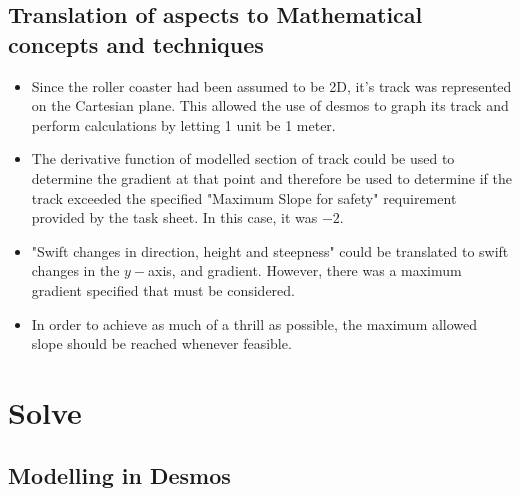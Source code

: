 \documentclass[11pt, letterpaper]{article}
\begin{document}
\subsection{Translation of aspects to Mathematical concepts and techniques}
\begin{itemize}
	\item Since the roller coaster had been assumed to be 2D, it's track was represented on the Cartesian plane. This allowed the use of desmos to graph its track and perform calculations by letting 1 unit be 1 meter. 
	\item The derivative function of modelled section of track could be used to determine the gradient at that point and therefore be used to determine if the track exceeded the specified "Maximum Slope for safety" requirement provided by the task sheet. In this case, it was $-2$.
	\item "Swift changes in direction, height and steepness" could be translated to swift changes in the $y-$axis, and gradient. However, there was a maximum gradient specified that must be considered. 
	\item In order to achieve as much of a thrill as possible, the maximum allowed slope should be reached whenever feasible.



\end{itemize}


\section{Solve}
\subsection{Modelling in Desmos}
\end{document}

